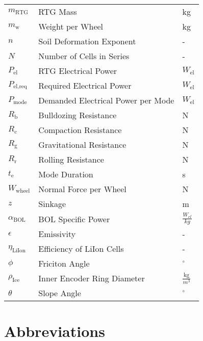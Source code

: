 \begin{longtable}[l]{lll}
$m_\text{RTG}$			&	RTG Mass									& kg							\\
\(m_\text{w}\)			&	Weight per Wheel							& kg							\\
\(n\)					&	Soil Deformation Exponent					& -								\\
$N$						&	Number of Cells in Series					& -								\\
$P_\text{el}$			&	RTG Electrical Power						& $W_\text{el}$					\\
$P_\text{el,req}$		&	Required Electrical Power					& $W_\text{el}$					\\
$P_\text{mode}$			&	Demanded Electrical Power per Mode			& $W_\text{el}$					\\
\(R_\text{b}\)			&	Bulldozing Resistance						& N								\\
\(R_\text{c}\)			&	Compaction Resistance						& N								\\
\(R_\text{g}\)			&	Gravitational Resistance					& N								\\
\(R_\text{r}\)			&	Rolling Resistance							& N								\\
$t_\text{e}$			&	Mode Duration								& s								\\
\(W_\text{wheel}\)		&	Normal Force per Wheel						& N								\\
\(z\)					&	Sinkage										& m								\\




$\alpha_\text{BOL}$		&	BOL Specific Power							& $\frac{W_{el}}{kg}$			\\
\(\epsilon\)			&	Emissivity 									&	-							\\
$\eta_\text{LiIon}$		&	Efficiency of LiIon Cells					& -								\\
\(\phi\)				&	Friciton Angle								& \(^\circ\)					\\
\(\rho_\text{Ice}\)		&	Inner Encoder Ring Diameter  				&	\(\frac{\text{kg}}{m^3}\)	\\
\(\theta\)				&	Slope Angle									& \(^\circ\)					\\






\end{longtable}

\chapter*{Abbreviations}

